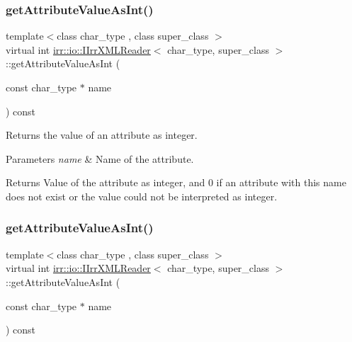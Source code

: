 \subsubsection{\texorpdfstring{get\+Attribute\+Value\+As\+Int()}{getAttributeValueAsInt()}\hspace{0.1cm}{\footnotesize\ttfamily [1/4]}}
{\footnotesize\ttfamily template$<$class char\+\_\+type , class super\+\_\+class $>$ \\
virtual int \hyperlink{classirr_1_1io_1_1IIrrXMLReader}{irr\+::io\+::\+I\+Irr\+X\+M\+L\+Reader}$<$ char\+\_\+type, super\+\_\+class $>$\+::get\+Attribute\+Value\+As\+Int (\begin{DoxyParamCaption}\item[{const char\+\_\+type $\ast$}]{name }\end{DoxyParamCaption}) const\hspace{0.3cm}{\ttfamily [pure virtual]}}



Returns the value of an attribute as integer. 


\begin{DoxyParams}{Parameters}
{\em name} & Name of the attribute. \\
\hline
\end{DoxyParams}
\begin{DoxyReturn}{Returns}
Value of the attribute as integer, and 0 if an attribute with this name does not exist or the value could not be interpreted as integer. 
\end{DoxyReturn}
\mbox{\label{classirr_1_1io_1_1IIrrXMLReader_ab37bef58865355a7dba0011a38e6c8e7}} 
\subsubsection{\texorpdfstring{get\+Attribute\+Value\+As\+Int()}{getAttributeValueAsInt()}\hspace{0.1cm}{\footnotesize\ttfamily [2/4]}}
{\footnotesize\ttfamily template$<$class char\+\_\+type , class super\+\_\+class $>$ \\
virtual int \hyperlink{classirr_1_1io_1_1IIrrXMLReader}{irr\+::io\+::\+I\+Irr\+X\+M\+L\+Reader}$<$ char\+\_\+type, super\+\_\+class $>$\+::get\+Attribute\+Value\+As\+Int (\begin{DoxyParamCaption}\item[{const char\+\_\+type $\ast$}]{name }\end{DoxyParamCaption}) const\hspace{0.3cm}{\ttfamily [pure virtual]}}



